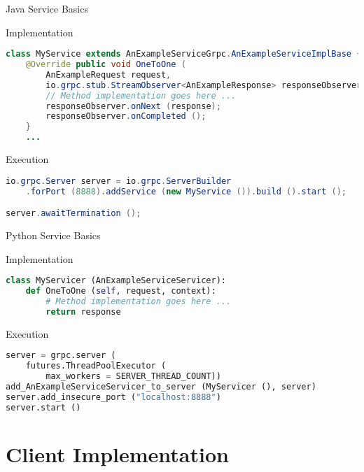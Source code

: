 \begin{frame}[fragile]{Java Service Basics}
    \begin{block}{Implementation}
\begin{lstlisting}[language=java,style=mini]
class MyService extends AnExampleServiceGrpc.AnExampleServiceImplBase {
    @Override public void OneToOne (
        AnExampleRequest request,
        io.grpc.stub.StreamObserver<AnExampleResponse> responseObserver) {
        // Method implementation goes here ...
        responseObserver.onNext (response);
        responseObserver.onCompleted ();
    }
    ...
\end{lstlisting}
    \end{block}
    \begin{block}{Execution}
\begin{lstlisting}[language=java,style=mini]
io.grpc.Server server = io.grpc.ServerBuilder
    .forPort (8888).addService (new MyService ()).build ().start ();

server.awaitTermination ();
\end{lstlisting}
    \end{block}
\end{frame}


\begin{frame}[fragile]{Python Service Basics}
    \begin{block}{Implementation}
\begin{lstlisting}[language=python,style=mini]
class MyServicer (AnExampleServiceServicer):
    def OneToOne (self, request, context):
        # Method implementation goes here ...
        return response
\end{lstlisting}
    \end{block}

    \bigskip

    \begin{block}{Execution}
\begin{lstlisting}[language=python,style=mini]
server = grpc.server (
    futures.ThreadPoolExecutor (
        max_workers = SERVER_THREAD_COUNT))
add_AnExampleServiceServicer_to_server (MyServicer (), server)
server.add_insecure_port ("localhost:8888")
server.start ()
\end{lstlisting}
    \end{block}
\end{frame}


\section{Client Implementation}


